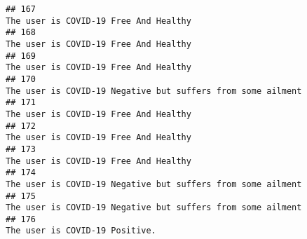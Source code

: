 \documentclass[
]{article}
\begin{document}
\begin{verbatim}
## 167                                                                                                                                                                                                                              The user is COVID-19 Free And Healthy
## 168                                                                                                                                                                                                                              The user is COVID-19 Free And Healthy
## 169                                                                                                                                                                                                                              The user is COVID-19 Free And Healthy
## 170                                                                                                                                                                                                        The user is COVID-19 Negative but suffers from some ailment
## 171                                                                                                                                                                                                                              The user is COVID-19 Free And Healthy
## 172                                                                                                                                                                                                                              The user is COVID-19 Free And Healthy
## 173                                                                                                                                                                                                                              The user is COVID-19 Free And Healthy
## 174                                                                                                                                                                                                        The user is COVID-19 Negative but suffers from some ailment
## 175                                                                                                                                                                                                        The user is COVID-19 Negative but suffers from some ailment
## 176                                                                                                                                                                                                                                     The user is COVID-19 Positive.

\end{verbatim}
\end{document}
